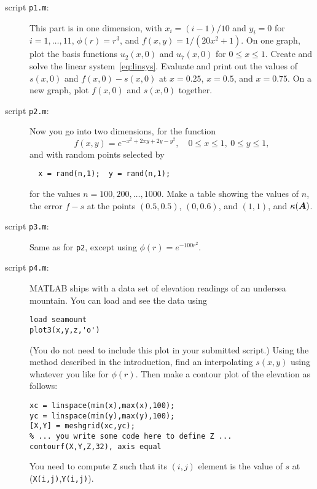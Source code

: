 \documentclass[11pt,letterpaper]{article}
\begin{document}
\begin{description}
\item[script \texttt{p1.m}:] This part is in one dimension, with $x_i=(i-1)/10$ and $y_i=0$ for $i=1,\ldots,11$, $\phi(r)=r^3$, and $f(x,y)=1/(20x^2+1)$. On one graph, plot the basis functions $u_2(x,0)$ and $u_7(x,0)$ for $0\le x \le 1$. Create and solve the linear system~\eqref{eq:linsys}. Evaluate and print out the values of $s(x,0)$ and $f(x,0)-s(x,0)$ at $x=0.25$, $x=0.5$, and $x=0.75$. On a new graph, plot $f(x,0)$ and $s(x,0)$ together. 
\item[script \texttt{p2.m}:] Now you go into two dimensions, for the function
  \begin{equation}
    \label{eq:func}
    f(x,y) = e^{ -x^2 + 2xy + 2y - y^2 }, \quad 0\le x \le 1, \: 0\le y \le 1,
  \end{equation}
 and with random points selected by
\begin{verbatim}
  x = rand(n,1);  y = rand(n,1);
\end{verbatim}
for the values $n=100,200,\ldots,1000$. Make a table showing the values of $n$, the error $f-s$ at the points $(0.5,0.5)$, $(0,0.6)$, and $(1,1)$, and $\kappa(\bm{A})$. 
\item[script \texttt{p3.m}:] Same as for \texttt{p2}, except using $\phi(r)=e^{-100r^2}$.
\item[script \texttt{p4.m}:] MATLAB ships with a data set of elevation readings of an undersea mountain. You can load and see the data using
\begin{verbatim}
load seamount
plot3(x,y,z,'o')
\end{verbatim}
(You do not need to include this plot in your submitted script.) Using the method described in the introduction, find an interpolating $s(x,y)$ using whatever you like for $\phi(r)$. Then make a contour plot of the elevation as follows:
\begin{verbatim}
xc = linspace(min(x),max(x),100);
yc = linspace(min(y),max(y),100);
[X,Y] = meshgrid(xc,yc);
% ... you write some code here to define Z ...
contourf(X,Y,Z,32), axis equal
\end{verbatim}
You need to compute \texttt{Z} such that its $(i,j)$ element is the value of $s$ at (\texttt{X(i,j)},\texttt{Y(i,j)}).

\end{description}
\end{document}
